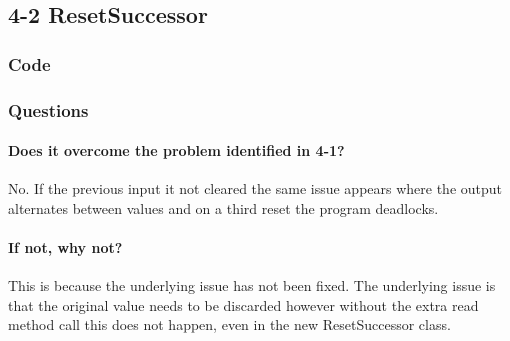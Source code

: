 \subsection{4-2 ResetSuccessor}

\subsubsection*{Code}




\subsubsection*{Questions}

\paragraph{Does it overcome the problem identified in 4-1?}

No.  If the previous input it not cleared the same issue appears where the output alternates between values and on a third reset the program deadlocks.

\paragraph{If not, why not?}

This is because the underlying issue has not been fixed.  The underlying issue is that the original value needs to be discarded however without the extra read method call this does not happen, even in the new ResetSuccessor class.